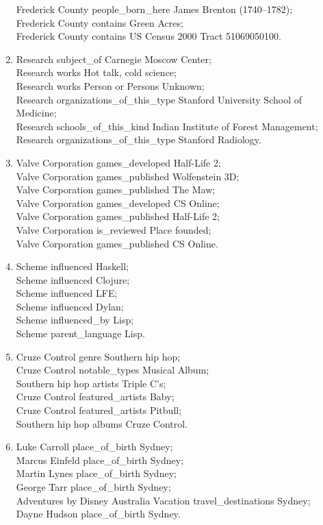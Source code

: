 \documentclass{sigmod}
\begin{document}
\begin{enumerate}
Frederick County people\_born\_here James Brenton (1740–1782);\\
Frederick County contains Green Acres;\\
Frederick County contains US Census 2000 Tract 51069050100.
\item Research subject\_of Carnegie Moscow Center;\\
Research works Hot talk, cold science;\\
Research works Person or Persons Unknown;\\
Research organizations\_of\_this\_type Stanford University School of Medicine;\\
Research schools\_of\_this\_kind Indian Institute of Forest Management;\\
Research organizations\_of\_this\_type Stanford Radiology.
\item Valve Corporation games\_developed Half-Life 2;\\
Valve Corporation games\_published Wolfenstein 3D;\\
Valve Corporation games\_published The Maw;\\
Valve Corporation games\_developed CS Online;\\
Valve Corporation games\_published Half-Life 2;\\
Valve Corporation is\_reviewed Place founded;\\
Valve Corporation games\_published CS Online.
\item Scheme influenced Haskell;\\
Scheme influenced Clojure;\\
Scheme influenced LFE;\\
Scheme influenced Dylan;\\
Scheme influenced\_by Lisp;\\
Scheme parent\_language Lisp.
\item Cruze Control genre Southern hip hop;\\
Cruze Control notable\_types Musical Album;\\
Southern hip hop artists Triple C's;\\
Cruze Control featured\_artists Baby;\\
Cruze Control featured\_artists Pitbull;\\
Southern hip hop albums Cruze Control.
\item Luke Carroll place\_of\_birth Sydney;\\
Marcus Einfeld place\_of\_birth Sydney;\\
Martin Lynes place\_of\_birth Sydney;\\
George Tarr place\_of\_birth Sydney;\\
Adventures by Disney \- Australia Vacation travel\_destinations Sydney;\\
Dayne Hudson place\_of\_birth Sydney.
\end{enumerate}

\end{document}
